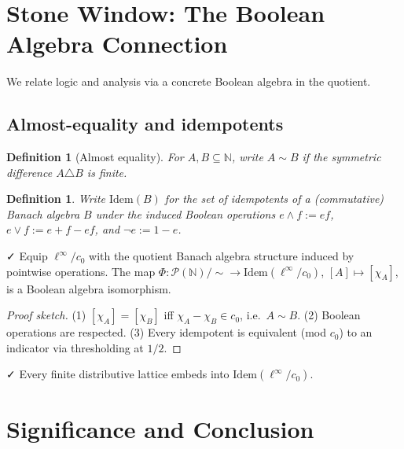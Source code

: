 \documentclass[11pt]{article}
\newtheorem{definition}[theorem]{Definition}
\newenvironment{defi}{\begin{definition}}{\end{definition}}
\newcommand{\leanok}{\textsf{\small \textcolor{green!70!black}{✓}}}
\newcommand{\N}{\mathbb{N}}
\newcommand{\linf}{\ell^\infty}
\newcommand{\cnull}{c_0}
\begin{document}
\section{Stone Window: The Boolean Algebra Connection}\label{sec:stone}

We relate logic and analysis via a concrete Boolean algebra in the quotient.

\subsection{Almost-equality and idempotents}

\begin{defi}[Almost equality]
For $A,B\subseteq\N$, write $A\sim B$ if the symmetric difference $A\triangle B$ is finite.
\end{defi}

\begin{defi}
Write $\mathrm{Idem}(B)$ for the set of idempotents of a (commutative) Banach algebra $B$ under the induced Boolean operations $e\wedge f:=ef$, $e\vee f:=e+f-ef$, and $\neg e:=1-e$.
\end{defi}

\begin{thm}\label{thm:stone}\leanok
Equip $\ell^\infty/c_0$ with the quotient Banach algebra structure induced by pointwise operations. The map
$\Phi:\mathcal{P}(\N)/{\sim}\to \mathrm{Idem}(\linf/\cnull)$,
$[A]\mapsto [\chi_A]$, is a Boolean algebra isomorphism.
\end{thm}

\begin{proof}[Proof sketch]
(1) $[\chi_A]=[\chi_B]$ iff $\chi_A-\chi_B\in \cnull$, i.e.\ $A\sim B$.  
(2) Boolean operations are respected.  
(3) Every idempotent is equivalent (mod $\cnull$) to an indicator via thresholding at $1/2$.
\end{proof}

\begin{cor}\leanok
Every finite distributive lattice embeds into $\mathrm{Idem}(\linf/\cnull)$.
\end{cor}

\section{Significance and Conclusion}
\end{document}
